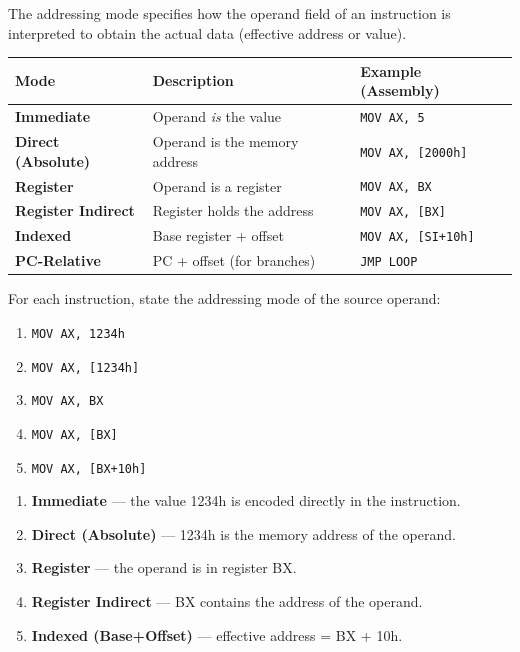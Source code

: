 \documentclass[11pt]{article}
\newcommand{\cle}[1]{{\popxbold\color{popdark}#1}}
\begin{document}
\begin{definition}
The \cle{addressing mode} specifies how the operand field of an instruction is interpreted to obtain the actual data (effective address or value).
\begin{center}
\begin{tabularx}{\linewidth}{|l|X|l|}
\hline
\rowcolor{popblueL} Mode & Description & Example (Assembly) \\ \hline
\textbf{Immediate} & Operand \emph{is} the value & \texttt{MOV AX, 5} \\ \hline
\textbf{Direct (Absolute)} & Operand is the memory address & \texttt{MOV AX, [2000h]} \\ \hline
\textbf{Register} & Operand is a register & \texttt{MOV AX, BX} \\ \hline
\textbf{Register Indirect} & Register holds the address & \texttt{MOV AX, [BX]} \\ \hline
\textbf{Indexed} & Base register + offset & \texttt{MOV AX, [SI+10h]} \\ \hline
\textbf{PC-Relative} & PC + offset (for branches) & \texttt{JMP LOOP} \\ \hline
\end{tabularx}
\end{center}
\end{definition}

\begin{exoresolu}
For each instruction, state the addressing mode of the source operand:
\begin{enumerate}
\item \texttt{MOV AX, 1234h}
\item \texttt{MOV AX, [1234h]}
\item \texttt{MOV AX, BX}
\item \texttt{MOV AX, [BX]}
\item \texttt{MOV AX, [BX+10h]}
\end{enumerate}
\tcblower
\begin{enumerate}
\item \textbf{Immediate} — the value 1234h is encoded directly in the instruction.
\item \textbf{Direct (Absolute)} — 1234h is the memory address of the operand.
\item \textbf{Register} — the operand is in register BX.
\item \textbf{Register Indirect} — BX contains the address of the operand.
\item \textbf{Indexed (Base+Offset)} — effective address = BX + 10h.
\end{enumerate}
\end{exoresolu}
\end{document}
